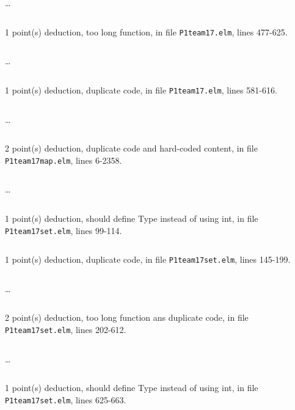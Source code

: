 \documentclass{article}
\begin{document}
\dots

\inputminted[firstline=448,lastline=457]{elm}{P1team17.elm}

1 point(s) {\color{red}deduction}, too long function, in file {\color{blue}\texttt{P1team17.elm}}, lines {\color{blue}477-625}.

\inputminted[firstline=477,lastline=486]{elm}{P1team17.elm}

\dots

\inputminted[firstline=616,lastline=625]{elm}{P1team17.elm}

1 point(s) {\color{red}deduction}, duplicate code, in file {\color{blue}\texttt{P1team17.elm}}, lines {\color{blue}581-616}.

\inputminted[firstline=581,lastline=590]{elm}{P1team17.elm}

\dots

\inputminted[firstline=607,lastline=616]{elm}{P1team17.elm}

2 point(s) {\color{red}deduction}, duplicate code and hard-coded content, in file {\color{blue}\texttt{P1team17map.elm}}, lines {\color{blue}6-2358}.

\inputminted[firstline=6,lastline=15]{elm}{P1team17map.elm}

\dots

\inputminted[firstline=2349,lastline=2358]{elm}{P1team17map.elm}

1 point(s) {\color{red}deduction}, should define Type instead of using int, in file {\color{blue}\texttt{P1team17set.elm}}, lines {\color{blue}99-114}.

\inputminted[firstline=99,lastline=114]{elm}{P1team17set.elm}

1 point(s) {\color{red}deduction}, duplicate code, in file {\color{blue}\texttt{P1team17set.elm}}, lines {\color{blue}145-199}.

\inputminted[firstline=145,lastline=154]{elm}{P1team17set.elm}

\dots

\inputminted[firstline=190,lastline=199]{elm}{P1team17set.elm}

2 point(s) {\color{red}deduction}, too long function ans duplicate code, in file {\color{blue}\texttt{P1team17set.elm}}, lines {\color{blue}202-612}.

\inputminted[firstline=202,lastline=211]{elm}{P1team17set.elm}

\dots

\inputminted[firstline=603,lastline=612]{elm}{P1team17set.elm}

1 point(s) {\color{red}deduction}, should define Type instead of using int, in file {\color{blue}\texttt{P1team17set.elm}}, lines {\color{blue}625-663}.
\end{document}
